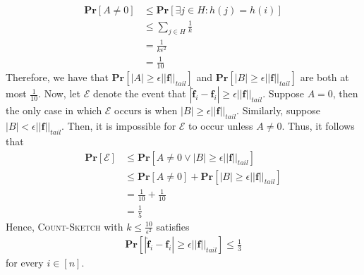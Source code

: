 \documentclass[12pt]{article}
\begin{document}
\begin{solution}
    \begin{align*}
        \textbf{Pr}[A \neq 0] &\leq \textbf{Pr}[\exists j \in H: h(j) = h(i)] \\
        &\leq \sum\limits_{j \in H} \frac{1}{k} \\
        &= \frac{1}{k\epsilon^2} \\
        &= \frac{1}{10}
    \end{align*}
    Therefore, we have that $\textbf{Pr}[|A| \geq \epsilon||\textbf{f}||_{tail}]$ and $\textbf{Pr}[|B| \geq \epsilon||\textbf{f}||_{tail}]$ are both at most $\frac{1}{10}$. Now, let $\mathcal{E}$ denote the event that $|\hat{\textbf{f}}_i - \textbf{f}_i| \geq \epsilon||\textbf{f}||_{tail}$. Suppose $A = 0$, then the only case in which $\mathcal{E}$ occurs is when $|B| \geq \epsilon||\textbf{f}||_{tail}$. Similarly, suppose $|B| < \epsilon||\textbf{f}||_{tail}$. Then, it is impossible for $\mathcal{E}$ to occur unless $A \neq 0$. Thus, it follows that
    \begin{align*}
        \textbf{Pr}[\mathcal{E}] &\leq \textbf{Pr}[A \neq 0 \lor |B| \geq \epsilon||\textbf{f}||_{tail}] \\
        &\leq \textbf{Pr}[A \neq 0] + \textbf{Pr}[|B| \geq \epsilon||\textbf{f}||_{tail}] \\
        &= \frac{1}{10} + \frac{1}{10} \\
        &= \frac{1}{5}
    \end{align*}
    Hence, \textsc{Count-Sketch} with $k \leq \frac{10}{\epsilon^2}$ satisfies 
    \begin{align*}
          \textbf{Pr}[|\hat{\textbf{f}}_i - \textbf{f}_i| \geq \epsilon ||\textbf{f}||_{tail}] \leq \frac{1}{3}
    \end{align*}
    for every $i \in [n]$.
\end{solution}
\end{document}
